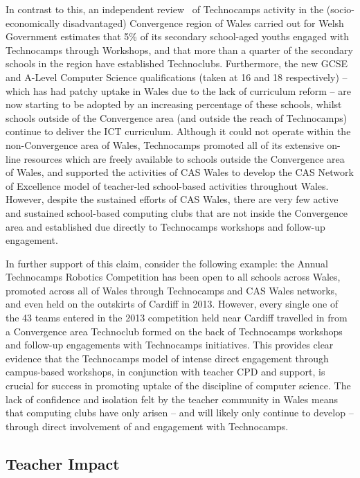\documentclass{llncs}
\begin{document}
In contrast to this, an independent review~\cite{Wavehill:2015} of
Technocamps activity in the (socio-economically disadvantaged)
Convergence region of Wales carried out for Welsh Government estimates
that 5\% of its secondary school-aged youths engaged with Technocamps
through Workshops, and that more than a quarter of the secondary
schools in the region have established Technoclubs.  Furthermore, the
new GCSE and A-Level Computer Science qualifications (taken at 16 and
18 respectively) -- which has had patchy uptake in Wales due to the
lack of curriculum reform -- are now starting to be adopted by an
increasing percentage of these schools, whilst schools outside of the
Convergence area (and outside the reach of Technocamps) continue to
deliver the ICT curriculum. Although it could not operate within the
non-Convergence area of Wales, Technocamps promoted all of its
extensive on-line resources which are freely available to schools
outside the Convergence area of Wales, and supported the activities of
CAS Wales to develop the CAS Network of Excellence model of
teacher-led school-based activities throughout Wales. However, despite
the sustained efforts of CAS Wales, there are very few active and
sustained school-based computing clubs that are not inside the
Convergence area and established due directly to Technocamps workshops
and follow-up engagement.

In further support of this claim, consider the following example: the Annual
Technocamps Robotics Competition has been open to all schools across
Wales, promoted across all of Wales through Technocamps and CAS Wales
networks, and even held on the outskirts of Cardiff in 2013.  However,
every single one of the 43 teams entered in the 2013 competition held
near Cardiff travelled in from a Convergence area Technoclub formed on
the back of Technocamps workshops and follow-up engagements with
Technocamps initiatives. This provides clear evidence that the
Technocamps model of intense direct engagement through campus-based
workshops, in conjunction with teacher CPD and support, is crucial for
success in promoting uptake of the discipline of computer science. The
lack of confidence and isolation felt by the teacher community in
Wales means that computing clubs have only arisen -- and will likely
only continue to develop -- through direct involvement of and
engagement with Technocamps.

\subsection{Teacher Impact}\label{teacherrecog}
\end{document}
